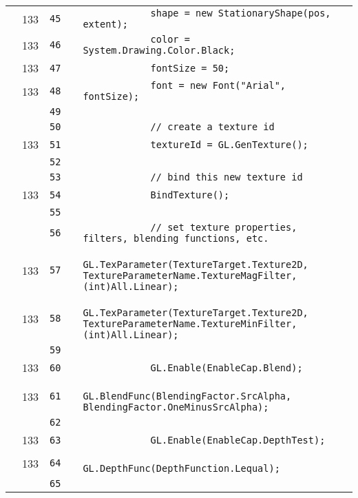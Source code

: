\documentclass[a4paper,landscape,10pt]{article}
\begin{document}
\begin{longtable}[l]{lrrll}
\cellcolor{green} & 133 & \verb~45~ & & \verb~            shape = new StationaryShape(pos, extent);~\\
\cellcolor{green} & 133 & \verb~46~ & & \verb~            color = System.Drawing.Color.Black;~\\
\cellcolor{green} & 133 & \verb~47~ & & \verb~            fontSize = 50;~\\
\cellcolor{green} & 133 & \verb~48~ & & \verb~            font = new Font("Arial", fontSize);~\\
\cellcolor{gray} &  & \verb~49~ & & \verb~~\\
\cellcolor{gray} &  & \verb~50~ & & \verb~            // create a texture id~\\
\cellcolor{green} & 133 & \verb~51~ & & \verb~            textureId = GL.GenTexture();~\\
\cellcolor{gray} &  & \verb~52~ & & \verb~~\\
\cellcolor{gray} &  & \verb~53~ & & \verb~            // bind this new texture id~\\
\cellcolor{green} & 133 & \verb~54~ & & \verb~            BindTexture();~\\
\cellcolor{gray} &  & \verb~55~ & & \verb~~\\
\cellcolor{gray} &  & \verb~56~ & & \verb~            // set texture properties, filters, blending functions, etc.~\\
\cellcolor{green} & 133 & \verb~57~ & & \verb~            GL.TexParameter(TextureTarget.Texture2D, TextureParameterName.TextureMagFilter, (int)All.Linear);~\\
\cellcolor{green} & 133 & \verb~58~ & & \verb~            GL.TexParameter(TextureTarget.Texture2D, TextureParameterName.TextureMinFilter, (int)All.Linear);~\\
\cellcolor{gray} &  & \verb~59~ & & \verb~~\\
\cellcolor{green} & 133 & \verb~60~ & & \verb~            GL.Enable(EnableCap.Blend);~\\
\cellcolor{green} & 133 & \verb~61~ & & \verb~            GL.BlendFunc(BlendingFactor.SrcAlpha, BlendingFactor.OneMinusSrcAlpha);~\\
\cellcolor{gray} &  & \verb~62~ & & \verb~~\\
\cellcolor{green} & 133 & \verb~63~ & & \verb~            GL.Enable(EnableCap.DepthTest);~\\
\cellcolor{green} & 133 & \verb~64~ & & \verb~            GL.DepthFunc(DepthFunction.Lequal);~\\
\cellcolor{gray} &  & \verb~65~ & & \verb~~\\

\end{longtable}
\end{document}
